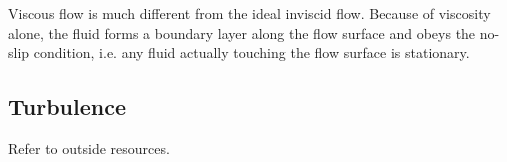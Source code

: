 \documentclass[11pt,dvipsnames]{thesis}
\begin{document}
Viscous flow is much different from the ideal inviscid flow. Because of viscosity alone, the fluid forms a boundary layer along the flow surface and obeys the no-slip condition, i.e. any fluid actually touching the flow surface is stationary.

\subsection{Turbulence}
Refer to outside resources.




\end{document}
